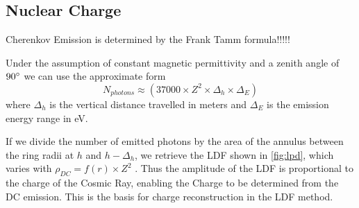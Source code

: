 \documentclass{article}
\begin{document}
\subsection{Nuclear Charge}
Cherenkov Emission is determined by the Frank Tamm formula!!!!! 

Under the assumption of constant magnetic permittivity and a zenith angle of $90\degree$ we can use the approximate form \[ N_{photons} \approx (37000 \times Z^{2} \times \Delta_{h} \times \Delta_{E})\] where $\Delta_{h}$ is the vertical distance travelled in meters and $\Delta_{E}$ is the emission energy range in eV.

If we divide the number of emitted photons by the area of the annulus between the ring radii at $h$ and $h - \Delta_{h}$, we retrieve the LDF shown in \ref{fig:lpd}, which varies with $ \rho_{DC}  = f(r) \times Z^{2}$ . Thus the amplitude of the LDF is proportional to the charge of the Cosmic Ray, enabling the Charge to be determined from the DC emission. This is the basis for charge reconstruction in the LDF method.
\end{document}
